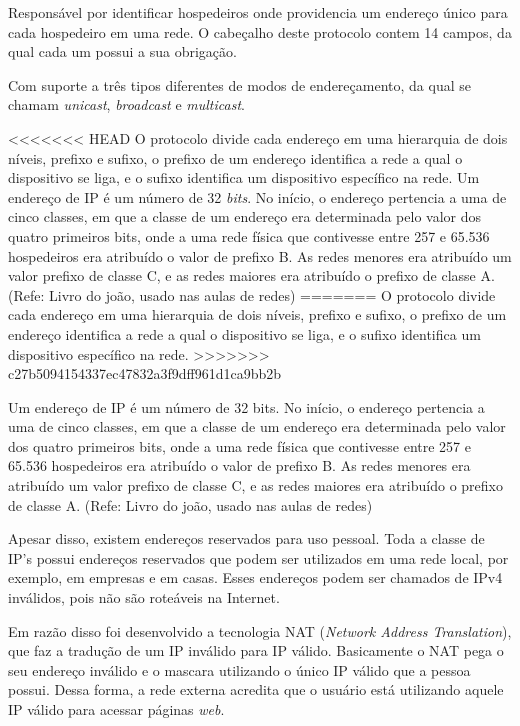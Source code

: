 Responsável por identificar hospedeiros onde providencia um endereço único para cada hospedeiro em uma rede. O cabeçalho deste protocolo contem 14 campos, da qual cada um possui a sua obrigação.

Com suporte a três tipos diferentes de modos de endereçamento, da qual se chamam \textit{unicast}, \textit{broadcast} e \textit{multicast}.

<<<<<<< HEAD
O protocolo divide cada endereço em uma hierarquia de dois níveis, prefixo e sufixo, o prefixo de um endereço identifica a rede a qual o dispositivo se liga, e o sufixo identifica um dispositivo específico na rede. Um endereço de IP é um número de 32 \textit{bits}. No início, o endereço pertencia a uma de cinco classes, em que a classe de um endereço era determinada pelo valor dos quatro primeiros bits, onde a uma rede física que contivesse entre 257 e 65.536 hospedeiros era atribuído o valor de prefixo B. As redes menores era atribuído um valor prefixo de classe C, e as redes maiores era atribuído o prefixo de classe A. (Refe: Livro do joão, usado nas aulas de redes)
=======
O protocolo divide cada endereço em uma hierarquia de dois níveis, prefixo e sufixo, o prefixo de um endereço identifica a rede a qual o dispositivo se liga, e o sufixo identifica um dispositivo específico na rede. 
>>>>>>> c27b5094154337ec47832a3f9dff961d1ca9bb2b

Um endereço de IP é um número de 32 bits. No início, o endereço pertencia a uma de cinco classes, em que a classe de um endereço era determinada pelo valor dos quatro primeiros bits, onde a uma rede física que contivesse entre 257 e 65.536 hospedeiros era atribuído o valor de prefixo B. As redes menores era atribuído um valor prefixo de classe C, e as redes maiores era atribuído o prefixo de classe A. (Refe: Livro do joão, usado nas aulas de redes)

Apesar disso, existem endereços reservados para uso pessoal. Toda a classe de IP's possui endereços reservados que podem ser utilizados em uma rede local, por exemplo, em empresas e em casas. Esses endereços podem ser chamados de IPv4 inválidos, pois não são roteáveis na Internet.

Em razão disso foi desenvolvido a tecnologia NAT (\textit{Network Address Translation}), que faz a tradução de um IP inválido para IP válido. Basicamente o NAT  pega o seu endereço inválido e o mascara utilizando o único IP válido que a pessoa possui. Dessa forma, a rede externa acredita que o usuário está utilizando aquele IP válido para acessar páginas \textit{web}.

